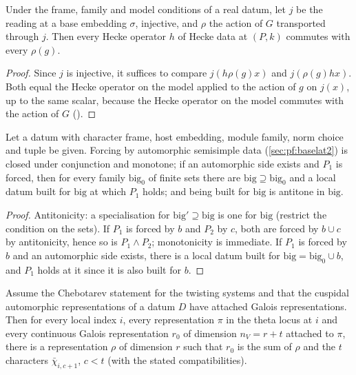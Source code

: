 \begin{lemma}\label{pf:stageU:commrho}
Under the frame, family and model conditions of a real datum, let $j$ be the reading at a base embedding $\sigma$, injective, and
$\rho$ the action of $G$ transported through $j$. Then every Hecke operator $h$ of Hecke data at $(P,k)$ commutes with every
$\rho(g)$.
\end{lemma}

\begin{proof}
Since $j$ is injective, it suffices to compare $j(h\rho(g)x)$ and $j(\rho(g)hx)$. Both equal the Hecke operator on the model
applied to the action of $g$ on $j(x)$, up to the same scalar, because the Hecke operator on the model commutes with the action of
$G$ ().
\end{proof}

\begin{lemma}\label{pf:stageU:evolaws}
Let a datum with character frame, host embedding, module family, norm choice and tuple be given. Forcing by automorphic
semisimple data (\cref{sec:pf:baselat2}) is closed under conjunction and monotone; if an automorphic side exists and $P_1$ is forced,
then for every family $\mathrm{big}_0$ of finite sets there are $\mathrm{big}\supseteq\mathrm{big}_0$ and a local datum built for $\mathrm{big}$ at which
$P_1$ holds; and being built for $\mathrm{big}$ is antitone in $\mathrm{big}$.
\end{lemma}

\begin{proof}
Antitonicity: a specialisation for $\mathrm{big}'\supseteq\mathrm{big}$ is one for $\mathrm{big}$ (restrict the condition on the sets). If $P_1$ is
forced by $b$ and $P_2$ by $c$, both are forced by $b\cup c$ by antitonicity, hence so is $P_1\wedge P_2$; monotonicity is immediate. If
$P_1$ is forced by $b$ and an automorphic side exists, there is a local datum built for $\mathrm{big}=\mathrm{big}_0\cup b$, and $P_1$ holds at
it since it is also built for $b$.
\end{proof}

\begin{lemma}\label{pf:stageU:complement}
Assume the Chebotarev statement for the twisting systems and that the cuspidal automorphic representations of a datum $D$ have
attached Galois representations. Then for every local index $i$, every representation $\pi$ in the theta locus at $i$ and every
continuous Galois representation $r_0$ of dimension $n_V=r+t$ attached to $\pi$, there is a representation $\rho$ of dimension $r$
such that $r_0$ is the sum of $\rho$ and the $t$ characters $\bar\chi_{i,c+1}$, $c<t$ (with the stated compatibilities).
\end{lemma}

